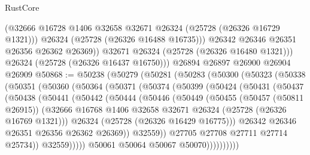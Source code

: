 \begin{lexlean}{RustCore}
\begin{coremodule}
              (@32666 @16728 @1406 @32658 @32671 @26324 (@25728 (@26326 @16729 @1321)))
              @26324
              (@25728 (@26326 @16488 @16735)))
            @26342
            @26346
            @26351
            @26356
            @26362
            @26369))
        @32671
        @26324
        (@25728 (@26326 @16480 @1321)))
      @26324
      (@25728 (@26326 @16437 @16750)))
    @26894
    @26897
    @26900
    @26904
    @26909
@50868 := @50238
    (@50279
      (@50281
        (@50283
          (@50300
            (@50323
              (@50338
                (@50351
                  (@50360
                    (@50364
                      (@50371
                        (@50374
                          (@50399
                            (@50424
                              (@50431
                                (@50437
                                  (@50438
                                    (@50441
                                      (@50442
                                        (@50444
                                          (@50446
                                            (@50449
                                              (@50455
                                                (@50457 (@50811 @26915))
                                                (@32666
                                                  @16768
                                                  @1406
                                                  @32658
                                                  @32671
                                                  @26324
                                                  (@25728 (@26326 @16769 @1321)))
                                                @26324
                                                (@25728 (@26326 @16429 @16775)))
                                              @26342
                                              @26346
                                              @26351
                                              @26356
                                              @26362
                                              @26369))
                                          @32559))
                                      @27705
                                      @27708
                                      @27711
                                      @27714
                                      @25734))
                                  @32559)))))
                        @50061
                        @50064
                        @50067
                        @50070))))))))))

\end{coremodule}
\end{lexlean}
